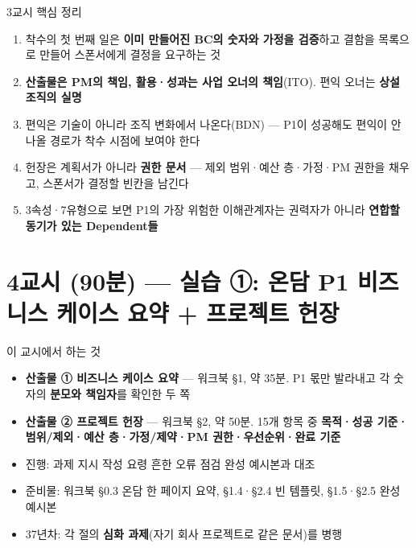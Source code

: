 \begin{frame}{3교시 핵심 정리}
\begin{enumerate}
\item 착수의 첫 번째 일은 \textbf{이미 만들어진 BC의 숫자와 가정을 검증}하고 결함을 목록으로 만들어 스폰서에게 결정을 요구하는 것
\item \textbf{산출물은 PM의 책임, 활용·성과는 사업 오너의 책임}(ITO). 편익 오너는 \textbf{상설 조직의 실명}
\item 편익은 기술이 아니라 조직 변화에서 나온다(BDN) — P1이 성공해도 편익이 안 나올 경로가 착수 시점에 보여야 한다
\item 헌장은 계획서가 아니라 \textbf{권한 문서} — 제외 범위·예산 층·가정·PM 권한을 채우고, 스폰서가 결정할 빈칸을 남긴다
\item 3속성·7유형으로 보면 P1의 가장 위험한 이해관계자는 권력자가 아니라 \textbf{연합할 동기가 있는 Dependent들}
\end{enumerate}
\end{frame}

\section{4교시 (90분) — 실습 ①: 온담 P1 비즈니스 케이스 요약 + 프로젝트 헌장}

\begin{frame}{이 교시에서 하는 것}
\begin{itemize}
\item \textbf{산출물 ① 비즈니스 케이스 요약} — 워크북 §1, 약 35분. P1 몫만 발라내고 각 숫자의 \textbf{분모와 책임자}를 확인한 두 쪽
\item \textbf{산출물 ② 프로젝트 헌장} — 워크북 §2, 약 50분. 15개 항목 중 \textbf{목적·성공 기준·범위/제외·예산 층·가정/제약·PM 권한·우선순위·완료 기준}
\item 진행: 과제 지시 \ra{} 작성 요령 \ra{} 흔한 오류 점검 \ra{} 완성 예시본과 대조
\item 준비물: 워크북 §0.3 온담 한 페이지 요약, §1.4·§2.4 빈 템플릿, §1.5·§2.5 완성 예시본
\item 3\til{}7년차: 각 절의 \textbf{심화 과제}(자기 회사 프로젝트로 같은 문서)를 병행
\end{itemize}
\end{frame}

